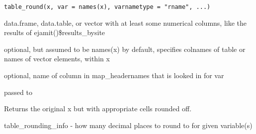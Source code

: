 \documentclass[a4paper]{book}
\begin{document}
%
\begin{Usage}
\begin{verbatim}
table_round(x, var = names(x), varnametype = "rname", ...)
\end{verbatim}
\end{Usage}
%
\begin{Arguments}
\begin{ldescription}
\item[\code{x}] data.frame, data.table, or vector with at least some numerical columns, like the results
of ejamit()\$results\_bysite

\item[\code{var}] optional, but assumed to be names(x) by default, specifies colnames of table
or names of vector elements, within x

\item[\code{varnametype}] optional, name of column in map\_headernames that is looked in for var

\item[\code{...}] passed to 
\end{ldescription}
\end{Arguments}
%
\begin{Value}
Returns the original x but with appropriate cells rounded off.
\end{Value}
%
\begin{SeeAlso}\relax
{} 
\end{SeeAlso}
%
\begin{Examples}
\end{Examples}
%
\begin{Description}\relax
table\_rounding\_info - how many decimal places to round to for given variable(s)
\end{Description}
\end{document}
